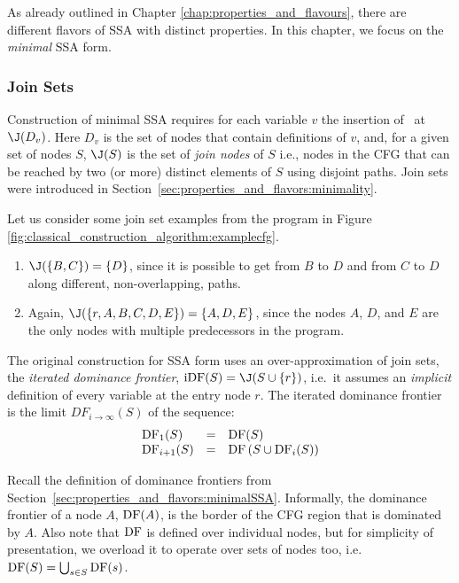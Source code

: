 As already outlined in Chapter \ref{chap:properties_and_flavours},
there are different flavors of SSA with distinct properties.
In this chapter, we focus on the \textit{minimal} SSA form.

\subsubsection*{Join Sets}

Construction of minimal SSA 
requires for each variable $v$ the insertion of \phiops\ at $\join(D_v)$.
Here $D_v$ is the set of nodes that contain definitions of $v$, and,
for a given set of nodes $S$, $\join(S)$ is the set of
\textit{join nodes} of $S$
i.e., nodes in the CFG that can be reached by
two (or more) distinct elements of $S$ using disjoint paths.
Join sets were introduced in Section~\ref{sec:properties_and_flavors:minimality}.

Let us consider some join set examples from the
program in Figure \ref{fig:classical_construction_algorithm:examplecfg}.
\begin{enumerate}
\item $\join(\{B,C\}) = \{D\}$, since it is possible to get from $B$ to $D$
and from $C$ to $D$ along different, non-overlapping, paths.
\item Again, $\join(\{r, A, B, C, D, E \}) = \{A,D,E\}$, since the nodes
$A$, $D$, and $E$ are the only nodes with multiple predecessors in
the program.
\end{enumerate}

 
The original construction for SSA form uses an over-approximation of
join sets, the
\emph{iterated dominance frontier}, $\iDF(S)=\join(S\cup
\{r\})$, i.e.\ it assumes an \emph{implicit} definition of every
variable at the entry node $r$.
The iterated dominance frontier is the limit $DF_{i\rightarrow\infty}(S)$
of the sequence:
$$\begin{array}{lll}
\mathrm{DF}_1(S) & = & \mathrm{DF}(S)\\
\mathrm{DF}_{i+1}(S) & = & \mathrm{DF}\left(S\cup \mathrm{DF}_i(S)\right)
\end{array}$$

Recall the definition of dominance frontiers from Section~\ref{sec:properties_and_flavors:minimalSSA}.
Informally, the dominance frontier of a node $A$, $\mathrm{DF}(A)$,
is the border of the CFG region that is dominated by $A$.
Also note that $\mathrm{DF}$ is defined over individual nodes, 
but for simplicity of presentation, we overload it to 
operate over sets of nodes too, i.e.\ 
$\mathrm{DF}(S) = \bigcup_{s\in S} \mathrm{DF}(s)$.

